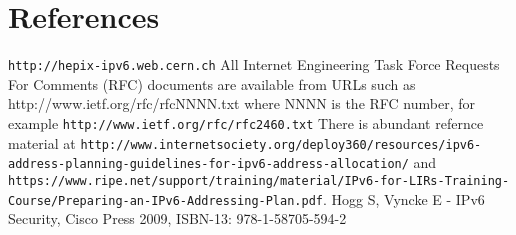 \section*{References}

\begin{thebibliography}{1}
 {\tt http://hepix-ipv6.web.cern.ch}
 All Internet Engineering Task Force Requests For Comments (RFC) documents are available
from URLs such as http://www.ietf.org/rfc/rfcNNNN.txt where NNNN is the RFC number, for example {\tt http://www.ietf.org/rfc/rfc2460.txt}
 There is abundant refernce material at
{\tt http://www.internetsociety.org/deploy360/resources/ipv6-address-planning-guidelines-for-ipv6-address-allocation/} and {\tt https://www.ripe.net/support/training/material/IPv6-for-LIRs-Training-Course/Preparing-an-IPv6-Addressing-Plan.pdf}.
    Hogg S, Vyncke E - IPv6 Security, Cisco Press 2009, ISBN-13: 978-1-58705-594-2
\end{thebibliography}
